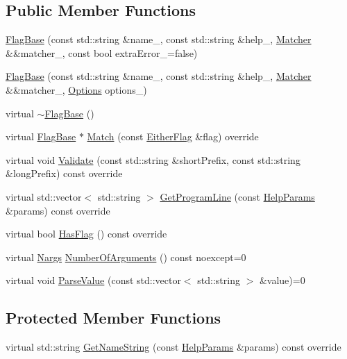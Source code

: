 \subsection*{Public Member Functions}
\begin{DoxyCompactItemize}
\item 
\hyperlink{classargs_1_1_flag_base_a9abcf8802dee008411f3b45fff44a3e1}{Flag\+Base} (const std\+::string \&name\+\_\+, const std\+::string \&help\+\_\+, \hyperlink{classargs_1_1_matcher}{Matcher} \&\&matcher\+\_\+, const bool extra\+Error\+\_\+=false)
\item 
\hyperlink{classargs_1_1_flag_base_ad99d8085ea99b778f96bad7872900d49}{Flag\+Base} (const std\+::string \&name\+\_\+, const std\+::string \&help\+\_\+, \hyperlink{classargs_1_1_matcher}{Matcher} \&\&matcher\+\_\+, \hyperlink{namespaceargs_aa530c0f95194aa275f49a5f299ac9e77}{Options} options\+\_\+)
\item 
virtual \hyperlink{classargs_1_1_flag_base_a37e287119643f8eca5eca883c3993a52}{$\sim$\+Flag\+Base} ()
\item 
virtual \hyperlink{classargs_1_1_flag_base}{Flag\+Base} $\ast$ \hyperlink{classargs_1_1_flag_base_a729ebb681d373f09875abb2e04f820f2}{Match} (const \hyperlink{structargs_1_1_either_flag}{Either\+Flag} \&flag) override
\item 
virtual void \hyperlink{classargs_1_1_flag_base_afd5a2cdea7f46caacc874c7c67ff6444}{Validate} (const std\+::string \&short\+Prefix, const std\+::string \&long\+Prefix) const override
\item 
virtual std\+::vector$<$ std\+::string $>$ \hyperlink{classargs_1_1_flag_base_aeb3153e728d38f0f3e0ea5df46fb4acc}{Get\+Program\+Line} (const \hyperlink{structargs_1_1_help_params}{Help\+Params} \&params) const override
\item 
virtual bool \hyperlink{classargs_1_1_flag_base_a67b6fa7bfd7b3ed18caeb2a6381ed1a2}{Has\+Flag} () const override
\item 
virtual \hyperlink{structargs_1_1_nargs}{Nargs} \hyperlink{classargs_1_1_flag_base_a6007ffeaa767893cb8eff5333d61673b}{Number\+Of\+Arguments} () const noexcept=0
\item 
virtual void \hyperlink{classargs_1_1_flag_base_a3421d9a595c9426dc73f62604cdee84f}{Parse\+Value} (const std\+::vector$<$ std\+::string $>$ \&value)=0
\end{DoxyCompactItemize}
\subsection*{Protected Member Functions}
\begin{DoxyCompactItemize}
\item 
virtual std\+::string \hyperlink{classargs_1_1_flag_base_a61db383104c1987904bcd331d8b3be76}{Get\+Name\+String} (const \hyperlink{structargs_1_1_help_params}{Help\+Params} \&params) const override
\end{DoxyCompactItemize}
